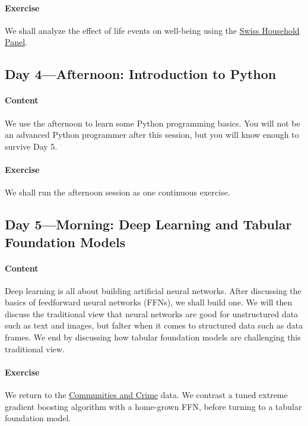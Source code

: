 \documentclass{article}
\begin{document}
\paragraph{Exercise}
We shall analyze the effect of life events on well-being using the \href{https://forscenter.ch/projects/swiss-household-panel/}{Swiss Household Panel}.

\subsection{Day 4---Afternoon: Introduction to Python}
\paragraph{Content}
We use the afternoon to learn some Python programming basics. You will not be an advanced Python programmer after this session, but you will know enough to survive Day 5.

\paragraph{Exercise}
We shall run the afternoon session as one continuous exercise.

\subsection{Day 5---Morning: Deep Learning and Tabular Foundation Models}
\paragraph{Content}
Deep learning is all about building artificial neural networks. After discussing the basics of feedforward neural networks (FFNs), we shall build one. We will then discuss the traditional view that neural networks are good for unstructured data such as text and images, but falter when it comes to structured data such as data frames. We end by discussing how tabular foundation models are challenging this traditional view.

\paragraph{Exercise}
We return to the \href{https://archive.ics.uci.edu/dataset/183/communities+and+crime}{Communities and Crime} data. We contrast a tuned extreme gradient boosting algorithm with a home-grown FFN, before turning to a tabular foundation model.
\end{document}
